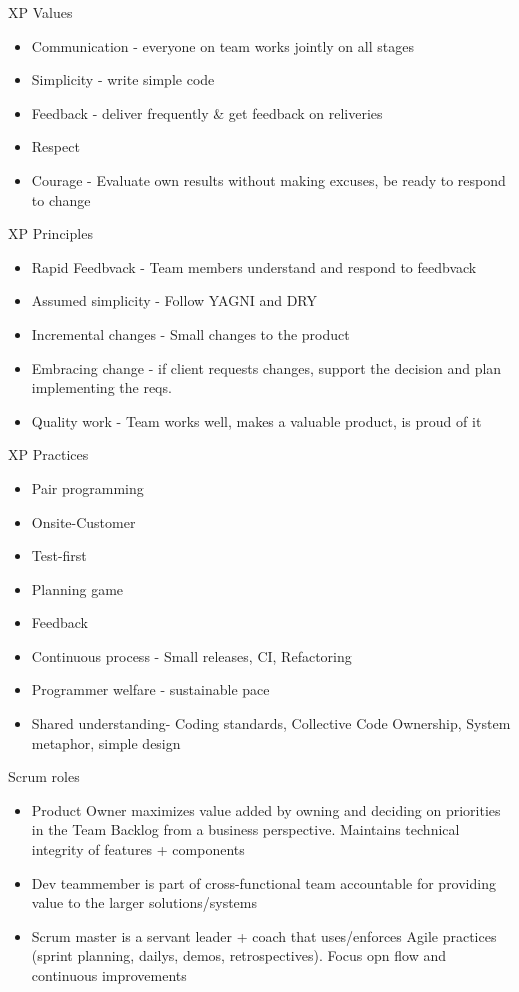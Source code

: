 \documentclass[10pt]{article}
\begin{document}
XP Values
\begin{itemize}
\item Communication - everyone on team works jointly on all stages
\item Simplicity - write simple code
\item Feedback - deliver frequently \& get feedback on reliveries
\item Respect
\item Courage - Evaluate own results without making excuses, be ready to respond to change
\end{itemize}
XP Principles
\begin{itemize}
\item Rapid Feedbvack - Team members understand and respond to feedbvack
\item Assumed simplicity - Follow YAGNI and DRY
\item Incremental changes - Small changes to the product
\item Embracing change - if client requests changes, support the decision and plan implementing the reqs.
\item Quality work - Team works well, makes a valuable product, is proud of it
\end{itemize}
XP Practices
\begin{itemize}
\item Pair programming
\item Onsite-Customer
\item Test-first
\item Planning game
\item Feedback
\item Continuous process - Small releases, CI, Refactoring
\item Programmer welfare - sustainable pace
\item Shared understanding- Coding standards, Collective Code Ownership, System metaphor, simple design
\end{itemize}
Scrum roles
\begin{itemize}
\item Product Owner maximizes value added by owning and deciding on priorities in the Team Backlog from a business perspective. Maintains technical integrity of features + components
\item Dev teammember is part of cross-functional team accountable for providing value to the larger solutions/systems
\item Scrum master is a servant leader + coach that uses/enforces Agile practices (sprint planning, dailys, demos, retrospectives). Focus opn flow and continuous improvements
\end{itemize}
\end{document}
